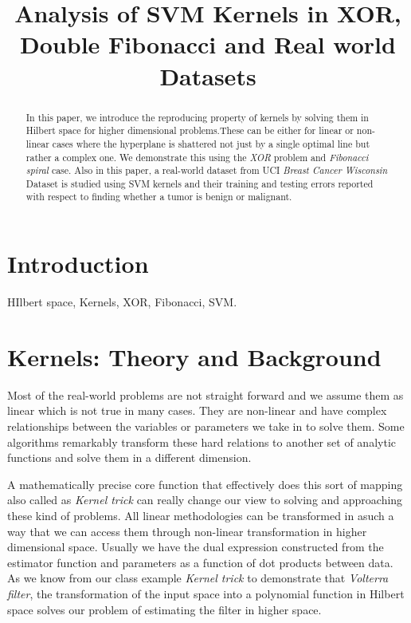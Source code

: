 \documentclass[conference]{IEEEtran}
\title{Analysis of SVM Kernels in XOR, Double Fibonacci and Real world Datasets}
\author{\IEEEauthorblockN{Gangadharan Esakki}
\IEEEauthorblockA{\{gesakki\}{\tt @unm.edu}\\
               Department of Electrical and Computer Engineering \\
              The University of New Mexico, United States}}
\begin{document}
\maketitle

\section{Introduction} 
\begin{abstract}

In this paper, we introduce the reproducing property of kernels by solving them in Hilbert space for higher dimensional problems.These can be either for linear or non-linear cases where the hyperplane is shattered not just by a single optimal line but rather a complex one. We demonstrate this using the \textit {XOR} problem and \textit {Fibonacci spiral} case. Also in this paper, a real-world dataset from UCI \textit {Breast Cancer Wisconsin} Dataset is studied using SVM kernels and their training and testing errors reported with respect to finding whether a tumor is benign or malignant. 

\end{abstract}

\begin{IEEEkeywords}
HIlbert space, Kernels, XOR, Fibonacci, SVM.
\end{IEEEkeywords}


\section{Kernels: Theory and Background}
Most of the real-world problems are not straight forward and we assume them as linear which is not true in many cases. They are non-linear and have complex relationships between the variables or parameters we take in to solve them. Some algorithms remarkably transform these hard relations to another set of analytic functions and solve them in a different dimension. 

A mathematically precise core function that effectively does this sort of mapping also called as \textit{Kernel trick} can really change our view to solving and approaching these kind of problems. All linear methodologies can be transformed in asuch a way that we can access them through non-linear transformation in higher dimensional space. Usually we have the dual expression constructed from the estimator function and parameters as a function of dot products between data. As we know from our class example \textit{Kernel trick} to demonstrate that \textit{Volterra filter}, the transformation of the input space into a polynomial function in Hilbert space \cite{kernme} solves our problem of estimating the filter in higher space. 
\end{document}
